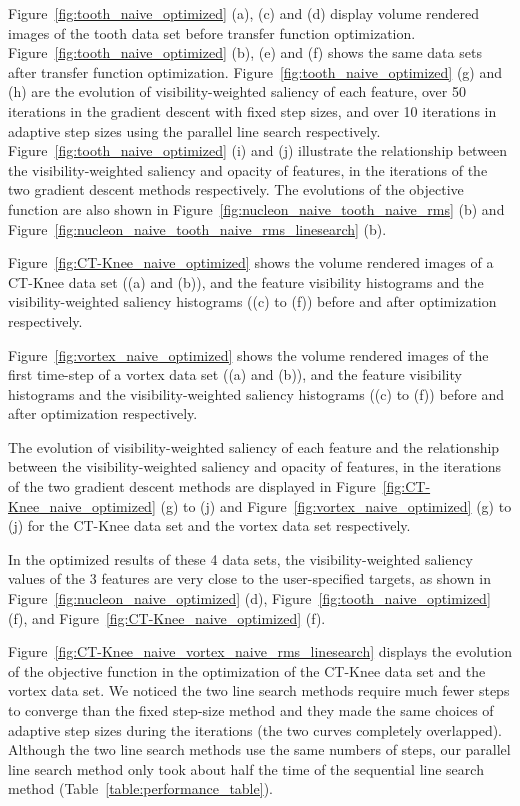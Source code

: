 Figure~\ref{fig:tooth_naive_optimized} (a), (c) and (d) display volume rendered images of the tooth data set before transfer function optimization. Figure~\ref{fig:tooth_naive_optimized} (b), (e) and (f) shows the same data sets after transfer function optimization.
Figure~\ref{fig:tooth_naive_optimized} (g) and (h) are the evolution of visibility-weighted saliency of each feature, over 50 iterations in the gradient descent with fixed step sizes, and over 10 iterations in adaptive step sizes using the parallel line search respectively. Figure~\ref{fig:tooth_naive_optimized} (i) and (j) illustrate the relationship between the visibility-weighted saliency and opacity of features, in the iterations of the two gradient descent methods respectively.
The evolutions of the objective function are also shown in Figure~\ref{fig:nucleon_naive_tooth_naive_rms} (b) and Figure~\ref{fig:nucleon_naive_tooth_naive_rms_linesearch} (b).

Figure~\ref{fig:CT-Knee_naive_optimized} shows the volume rendered images of a CT-Knee data set ((a) and (b)), and the feature visibility histograms and the visibility-weighted saliency histograms ((c) to (f)) before and after optimization respectively.

Figure~\ref{fig:vortex_naive_optimized} shows the volume rendered images of the first time-step of a vortex data set ((a) and (b)), and the feature visibility histograms and the visibility-weighted saliency histograms ((c) to (f)) before and after optimization respectively.

The evolution of visibility-weighted saliency of each feature and the relationship between the visibility-weighted saliency and opacity of features, in the iterations of the two gradient descent methods are displayed in Figure~\ref{fig:CT-Knee_naive_optimized} (g) to (j) and Figure~\ref{fig:vortex_naive_optimized} (g) to (j) for the CT-Knee data set and the vortex data set respectively.

In the optimized results of these 4 data sets, the visibility-weighted saliency values of the 3 features are very close to the user-specified targets, as shown in Figure~\ref{fig:nucleon_naive_optimized} (d), Figure~\ref{fig:tooth_naive_optimized} (f), and Figure~\ref{fig:CT-Knee_naive_optimized} (f).

Figure~\ref{fig:CT-Knee_naive_vortex_naive_rms_linesearch} displays the evolution of the objective function in the optimization of the CT-Knee data set and the vortex data set.
We noticed the two line search methods require much fewer steps to converge than the fixed step-size method and they made the same choices of adaptive step sizes during the iterations (the two curves completely overlapped).
Although the two line search methods use the same numbers of steps, our parallel line search method only took about half the time of the sequential line search method (Table~\ref{table:performance_table}).

